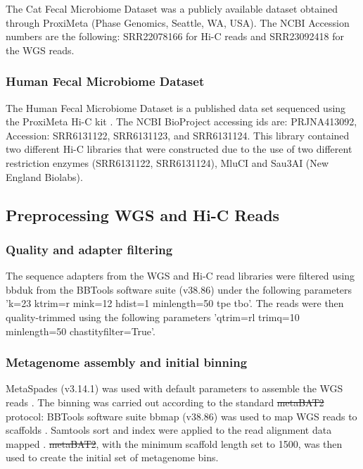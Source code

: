 \documentclass[fleqn,10pt,lineno]{wlpeerj}
\providecommand{\DIFaddtex}[1]{{\protect\color{blue}\uwave{#1}}} %
\providecommand{\DIFdeltex}[1]{{\protect\color{red}\sout{#1}}}                      %
\providecommand{\DIFaddbegin}{} %
\providecommand{\DIFaddend}{} %
\providecommand{\DIFdelbegin}{} %
\providecommand{\DIFdelend}{} %
\providecommand{\DIFadd}[1]{\texorpdfstring{\DIFaddtex{#1}}{#1}} %
\providecommand{\DIFdel}[1]{\texorpdfstring{\DIFdeltex{#1}}{}} %
\newcommand{\DIFscaledelfig}{0.5}
\newlength{\DIFdelgraphicswidth} %
\newlength{\DIFdelgraphicsheight} %
\newcommand{\DIFaddincludegraphics}[2][]{{\color{blue}\fbox{\DIFOincludegraphics[#1]{#2}}}} %
\newcommand{\DIFdelincludegraphics}[2][]{%
\sbox{\DIFdelgraphicsbox}{\DIFOincludegraphics[#1]{#2}}%
\settoboxwidth{\DIFdelgraphicswidth}{\DIFdelgraphicsbox} %
\settoboxtotalheight{\DIFdelgraphicsheight}{\DIFdelgraphicsbox} %
\scalebox{\DIFscaledelfig}{%
\parbox[b]{\DIFdelgraphicswidth}{\usebox{\DIFdelgraphicsbox}\\[-\baselineskip] \rule{\DIFdelgraphicswidth}{0em}}\llap{\resizebox{\DIFdelgraphicswidth}{\DIFdelgraphicsheight}{%
\setlength{\unitlength}{\DIFdelgraphicswidth}%
\begin{picture}(1,1)%
\thicklines\linethickness{2pt} %
{\color[rgb]{1,0,0}\put(0,0){\framebox(1,1){}}}%
{\color[rgb]{1,0,0}\put(0,0){\line( 1,1){1}}}%
{\color[rgb]{1,0,0}\put(0,1){\line(1,-1){1}}}%
\end{picture}%
}\hspace*{3pt}}} %
} %
\DeclareRobustCommand{\DIFaddbegin}{\DIFOaddbegin \let\includegraphics\DIFaddincludegraphics} %
\DeclareRobustCommand{\DIFaddend}{\DIFOaddend \let\includegraphics\DIFOincludegraphics} %
\DeclareRobustCommand{\DIFdelbegin}{\DIFOdelbegin \let\includegraphics\DIFdelincludegraphics} %
\DeclareRobustCommand{\DIFdelend}{\DIFOaddend \let\includegraphics\DIFOincludegraphics} %
\begin{document}
The Cat Fecal Microbiome Dataset was a publicly available dataset obtained through ProxiMeta (Phase Genomics, Seattle, WA, USA). The NCBI Accession numbers are the following: SRR22078166 for Hi-C reads and SRR23092418 for the WGS reads.

\subsubsection*{Human Fecal Microbiome Dataset}

The Human Fecal Microbiome Dataset is a published data set sequenced using the ProxiMeta Hi-C kit \citep{press2017hi}. The NCBI BioProject accessing ids are: PRJNA413092, Accession: SRR6131122, SRR6131123, and SRR6131124. This library contained two different Hi-C libraries that were constructed due to the use of two different restriction enzymes (SRR6131122, SRR6131124), MluCI and Sau3AI (New England Biolabs).    

\subsection*{Preprocessing WGS and Hi-C Reads}

\subsubsection*{Quality and adapter filtering}

The sequence adapters from the WGS and Hi-C read libraries were filtered using bbduk from the BBTools software suite (v38.86) \citep{bushnell2014bbmap} under the following parameters 'k=23 ktrim=r mink=12 hdist=1 minlength=50 tpe tbo'. The reads were then quality-trimmed using the following parameters 'qtrim=rl trimq=10 minlength=50 chastityfilter=True'. 

\subsubsection*{Metagenome assembly and initial binning}

MetaSpades (v3.14.1) was used with default parameters to assemble the WGS reads \citep{nurk2017metaspades}. The binning was carried out according to the standard \DIFdelbegin \DIFdel{metaBAT2 }\DIFdelend \DIFaddbegin \DIFadd{metaBAT 2 }\DIFaddend protocol: BBTools software suite bbmap (v38.86) was used to map WGS reads to scaffolds \citep{bushnell2014bbmap}. Samtools sort and index were applied to the read alignment data mapped \citep{li2009sequence}. \DIFdelbegin \DIFdel{metaBAT2}\DIFdelend \DIFaddbegin \DIFadd{metaBAT 2}\DIFaddend , with the minimum scaffold length set to 1500, was then used to create the initial set of metagenome bins.
\end{document}
